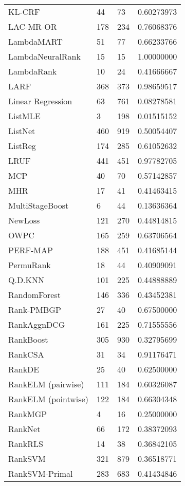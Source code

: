 \begin{table}
\begin{tabular}{l|l|l|l}
KL-CRF &  44 & 73 & 0.60273973 \\ 
LAC-MR-OR & 178 & 234  & 0.76068376 \\ 
LambdaMART & 51 & 77 & 0.66233766 \\ 
LambdaNeuralRank & 15 & 15 & 1.00000000 \\ 
LambdaRank & 10 & 24 & 0.41666667 \\ 
LARF & 368 & 373 & 0.98659517 \\ 
Linear Regression & 63 & 761  & 0.08278581 \\ 
ListMLE & 3 & 198 & 0.01515152 \\ 
ListNet & 460 & 919 & 0.50054407 \\ 
ListReg & 174 & 285 & 0.61052632 \\ 
LRUF & 441 & 451 & 0.97782705 \\ 
MCP & 40 & 70 & 0.57142857 \\ 
MHR & 17 & 41 & 0.41463415 \\ 
MultiStageBoost & 6  & 44 & 0.13636364 \\ 
NewLoss & 121 & 270 & 0.44814815 \\ 
OWPC & 165 & 259 & 0.63706564 \\ 
PERF-\acs{MAP} & 188 & 451 & 0.41685144 \\ 
PermuRank & 18 & 44 & 0.40909091 \\ 
Q.D.\acs{KNN} & 101 & 225 & 0.44888889 \\ 
RandomForest & 146 & 336 & 0.43452381 \\ 
Rank-PMBGP & 27 & 40 & 0.67500000 \\ 
RankAgg\acs{nDCG} & 161 & 225 & 0.71555556 \\ 
RankBoost & 305 & 930 & 0.32795699 \\ 
RankCSA & 31 & 34 & 0.91176471 \\ 
RankDE & 25 & 40 & 0.62500000 \\ 
RankELM (pairwise) & 111 & 184 & 0.60326087 \\ 
RankELM (pointwise) & 122 & 184 & 0.66304348 \\ 
RankMGP & 4 & 16 & 0.25000000 \\ 
RankNet & 66 & 172 & 0.38372093 \\ 
Rank\acs{RLS} & 14 & 38 & 0.36842105 \\ 
Rank\acs{SVM} & 321 & 879 & 0.36518771 \\ 
Rank\acs{SVM}-Primal & 283 & 683 & 0.41434846 \\ 

\end{tabular}
\end{table}
